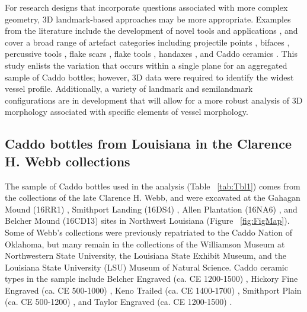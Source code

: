 \documentclass[review]{elsarticle}
\begin{document}
For research designs that incorporate questions associated with more complex geometry, 3D landmark-based approaches may be more appropriate. Examples from the literature include the development of novel tools and applications \citep{RN1722}, and cover a broad range of artefact categories including projectile points \citep{RN1750,RN1755}, bifaces \citep{RN1727,RN4392,RN11550}, percussive tools \citep{RN1772}, flake scars \citep{RN253}, flake tools \citep{RN11552}, handaxes \citep{RN1730,RN1766,RN3145,RN1733,RN335}, and Caddo ceramics \citep{RN1994}. This study enlists the variation that occurs within a single plane for an aggregated sample of Caddo bottles; however, 3D data were required to identify the widest vessel profile. Additionally, a variety of landmark and semilandmark configurations are in development that will allow for a more robust analysis of 3D morphology associated with specific elements of vessel morphology.

\subsection{Caddo bottles from Louisiana in the Clarence H. Webb collections}

The sample of Caddo bottles used in the analysis (Table ~\ref{tab:Tbl1}) comes from the collections of the late Clarence H. Webb, and were excavated at the Gahagan Mound (16RR1) \citep{RN5274x}, Smithport Landing (16DS4) \citep{RN5270x}, Allen Plantation (16NA6) \citep{RN11778x}, and Belcher Mound (16CD13) \citep{RN5276x,RN5266x} sites in Northwest Louisiana (Figure ~\ref{fig:FigMap}). Some of Webb's collections were previously repatriated to the Caddo Nation of Oklahoma, but many remain in the collections of the Williamson Museum at Northwestern State University, the Louisiana State Exhibit Museum, and the Louisiana State University (LSU) Museum of Natural Science. Caddo ceramic types in the sample include Belcher Engraved (ca. CE 1200-1500) \citep[9, and Plate 5]{RN4302}, Hickory Fine Engraved (ca. CE 500-1000) \citep[71, and Plate 36]{RN4302}, Keno Trailed (ca. CE 1400-1700) \citep[87, and Plate 44]{RN4302}, Smithport Plain (ca. CE 500-1200) \citep[145, and Plate 73]{RN4302}, and Taylor Engraved (ca. CE 1200-1500) \citep[149-151, and Plates 75-76]{RN4302}.
\end{document}
